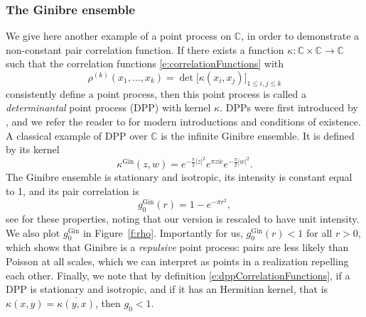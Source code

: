 \subsubsection{The Ginibre ensemble}
\label{e:ginibre}
We give here another example of a point process on $\mathbb{C}$, in
order to demonstrate a non-constant pair correlation function. If
there exists a function $\kappa:\mathbb{C}\times\mathbb{C}\rightarrow \mathbb{C}$
such that the correlation functions \eqref{e:correlationFunctions} with 
\begin{equation}
\rho^{(k)}(x_1,\dots,x_k) = \det \big[\kappa(x_i,x_j)\big]_{1\leq i,j\leq k}
\label{e:dppCorrelationFunctions}
\end{equation}
consistently define a point process, then this point process is called a
\emph{determinantal} point process (DPP) with kernel $\kappa$. DPPs were first
introduced by \cite{Mac75}, and we refer the reader to \citep{HKPV06,LaMoRu14}
for modern introductions and conditions of
existence. A classical example of DPP
over $\mathbb{C}$ is the infinite Ginibre ensemble. It is defined by its kernel
$$\kappa^{\text{Gin}}(z,w) = e^{-\frac{\pi}{2}\vert z\vert^2} e^{\pi z\bar w}
e^{-\frac{\pi}{2}\vert w\vert^2}.$$
The Ginibre ensemble is stationary
and isotropic, its intensity is constant equal to 1, and its pair correlation is
$$
g_0^{\text{Gin}}(r) = 1 - e^{-\pi r^2},
$$
see \cite[Section 4.3.7]{HKPV09} for these properties, noting that our version
is rescaled to have unit intensity. We also plot
$g_0^{\text{Gin}}$ in Figure~\ref{f:rho}. Importantly for us,
$g_0^{\text{Gin}}(r)<1$ for all $r>0$, which shows that Ginibre is a
\emph{repulsive} point process: pairs are less likely than Poisson at all
scales, which we can interpret as points in a realization repelling each other.
Finally, we note that by definition \eqref{e:dppCorrelationFunctions}, if a DPP
is stationary and isotropic, and if it has an Hermitian kernel, that is $\kappa(x,y)=\overline{\kappa(y,x)}$, then $g_0<1$. 

